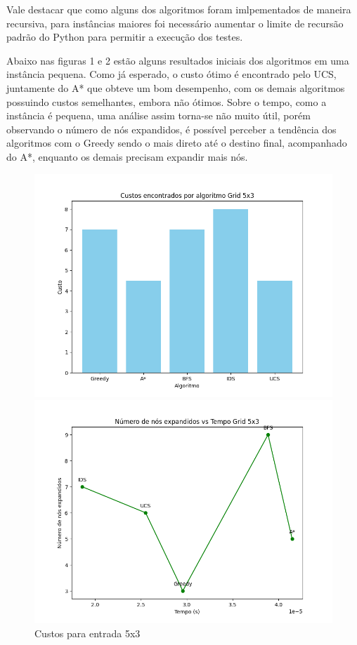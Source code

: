 \documentclass[10pt]{extarticle} %
\begin{document}
Vale destacar que como alguns dos algoritmos foram imlpementados de maneira recursiva, para instâncias maiores foi necessário aumentar o limite de recursão padrão do Python para permitir a execução dos testes.

Abaixo nas figuras 1 e 2 estão alguns resultados iniciais dos algoritmos em uma instância pequena. Como já esperado, o custo ótimo é encontrado pelo UCS, juntamente do A* que obteve um bom desempenho, com os demais algoritmos possuindo custos semelhantes, embora não ótimos. Sobre o tempo, como a instância é pequena, uma análise assim torna-se não muito útil, porém observando o número de nós expandidos, é possível perceber a tendência dos algoritmos com o Greedy sendo o mais direto até o destino final, acompanhado do A*, enquanto os demais precisam expandir mais nós.

\begin{figure}[H]
    \centering
    \begin{minipage}{0.5\linewidth}
        \centering
        \includegraphics[width=\linewidth]{cost_per_algorithm_5x3.png}
        \caption{Custos para entrada 5x3}
        \label{fig:cost-per-algorithm}
    \end{minipage}%
    \begin{minipage}{0.5\linewidth}
        \centering
        \includegraphics[width=\linewidth]{expanded_nodes_vs_time_labeled_5x3.png}

\end{minipage}
\end{figure}
\end{document}
